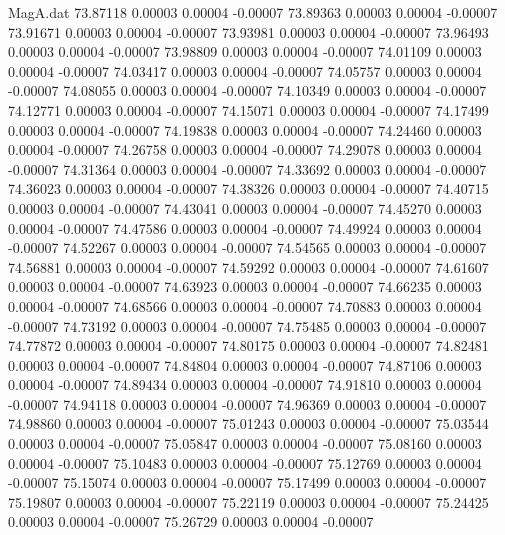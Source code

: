 \begin{filecontents}{MagA.dat}
  73.87118    0.00003    0.00004   -0.00007
  73.89363    0.00003    0.00004   -0.00007
  73.91671    0.00003    0.00004   -0.00007
  73.93981    0.00003    0.00004   -0.00007
  73.96493    0.00003    0.00004   -0.00007
  73.98809    0.00003    0.00004   -0.00007
  74.01109    0.00003    0.00004   -0.00007
  74.03417    0.00003    0.00004   -0.00007
  74.05757    0.00003    0.00004   -0.00007
  74.08055    0.00003    0.00004   -0.00007
  74.10349    0.00003    0.00004   -0.00007
  74.12771    0.00003    0.00004   -0.00007
  74.15071    0.00003    0.00004   -0.00007
  74.17499    0.00003    0.00004   -0.00007
  74.19838    0.00003    0.00004   -0.00007
  74.24460    0.00003    0.00004   -0.00007
  74.26758    0.00003    0.00004   -0.00007
  74.29078    0.00003    0.00004   -0.00007
  74.31364    0.00003    0.00004   -0.00007
  74.33692    0.00003    0.00004   -0.00007
  74.36023    0.00003    0.00004   -0.00007
  74.38326    0.00003    0.00004   -0.00007
  74.40715    0.00003    0.00004   -0.00007
  74.43041    0.00003    0.00004   -0.00007
  74.45270    0.00003    0.00004   -0.00007
  74.47586    0.00003    0.00004   -0.00007
  74.49924    0.00003    0.00004   -0.00007
  74.52267    0.00003    0.00004   -0.00007
  74.54565    0.00003    0.00004   -0.00007
  74.56881    0.00003    0.00004   -0.00007
  74.59292    0.00003    0.00004   -0.00007
  74.61607    0.00003    0.00004   -0.00007
  74.63923    0.00003    0.00004   -0.00007
  74.66235    0.00003    0.00004   -0.00007
  74.68566    0.00003    0.00004   -0.00007
  74.70883    0.00003    0.00004   -0.00007
  74.73192    0.00003    0.00004   -0.00007
  74.75485    0.00003    0.00004   -0.00007
  74.77872    0.00003    0.00004   -0.00007
  74.80175    0.00003    0.00004   -0.00007
  74.82481    0.00003    0.00004   -0.00007
  74.84804    0.00003    0.00004   -0.00007
  74.87106    0.00003    0.00004   -0.00007
  74.89434    0.00003    0.00004   -0.00007
  74.91810    0.00003    0.00004   -0.00007
  74.94118    0.00003    0.00004   -0.00007
  74.96369    0.00003    0.00004   -0.00007
  74.98860    0.00003    0.00004   -0.00007
  75.01243    0.00003    0.00004   -0.00007
  75.03544    0.00003    0.00004   -0.00007
  75.05847    0.00003    0.00004   -0.00007
  75.08160    0.00003    0.00004   -0.00007
  75.10483    0.00003    0.00004   -0.00007
  75.12769    0.00003    0.00004   -0.00007
  75.15074    0.00003    0.00004   -0.00007
  75.17499    0.00003    0.00004   -0.00007
  75.19807    0.00003    0.00004   -0.00007
  75.22119    0.00003    0.00004   -0.00007
  75.24425    0.00003    0.00004   -0.00007
  75.26729    0.00003    0.00004   -0.00007

\end{filecontents}
